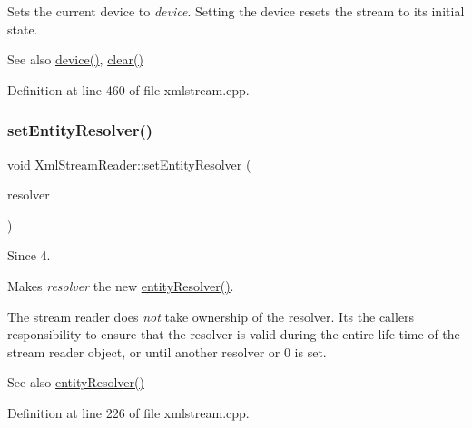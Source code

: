 Sets the current device to {\itshape device}. Setting the device resets the stream to its initial state.

\begin{DoxySeeAlso}{See also}
\hyperlink{class_xml_stream_reader_aa2a751d1b36fac13138b2f370683dfe7}{device()}, \hyperlink{class_xml_stream_reader_a2a67f5a1fff83d33214ccc9ec9494ca0}{clear()} 
\end{DoxySeeAlso}


Definition at line 460 of file xmlstream.\+cpp.

\mbox{\label{class_xml_stream_reader_af77e0f8b78b6cedfaec4a34634670893}} 
\subsubsection{\texorpdfstring{set\+Entity\+Resolver()}{setEntityResolver()}}
{\footnotesize\ttfamily void Xml\+Stream\+Reader\+::set\+Entity\+Resolver (\begin{DoxyParamCaption}\item[{\hyperlink{class_xml_stream_entity_resolver}{Xml\+Stream\+Entity\+Resolver} $\ast$}]{resolver }\end{DoxyParamCaption})}

\begin{DoxySince}{Since}
4.
\end{DoxySince}
Makes {\itshape resolver} the new \hyperlink{class_xml_stream_reader_aac2531acc527bccec511df4c29ed2ff8}{entity\+Resolver()}.

The stream reader does {\itshape not} take ownership of the resolver. It\textquotesingle{}s the callers responsibility to ensure that the resolver is valid during the entire life-\/time of the stream reader object, or until another resolver or 0 is set.

\begin{DoxySeeAlso}{See also}
\hyperlink{class_xml_stream_reader_aac2531acc527bccec511df4c29ed2ff8}{entity\+Resolver()} 
\end{DoxySeeAlso}


Definition at line 226 of file xmlstream.\+cpp.

\mbox{\label{class_xml_stream_reader_a3a0bd3dc7aca930af2a53591309f9e8e}} 
